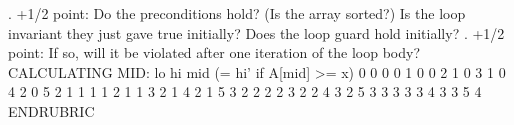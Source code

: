 . +1/2 point: Do the preconditions hold? (Is the array sorted?)
               Is the loop invariant they just gave true initially?
               Does the loop guard hold initially?
. +1/2 point: If so, will it be violated after one iteration of the loop body?
     CALCULATING MID: lo     hi    mid (= hi' if A[mid] >= x)
                      0      0      0
                      0      1      0
                      0      2      1
                      0      3      1
                      0      4      2
                      0      5      2
                      1      1      1
                      1      2      1
                      1      3      2
                      1      4      2
                      1      5      3
                      2      2      2
                      2      3      2
                      2      4      3
                      2      5      3
                      3      3      3
                      3      4      3
                      3      5      4
ENDRUBRIC
